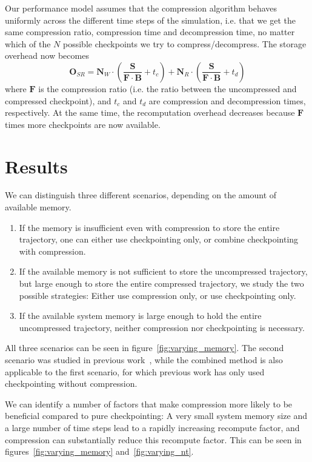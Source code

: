 \documentclass[conference]{IEEEtran}
\begin{document}
Our performance model assumes
 that the compression algorithm behaves uniformly
across the different time steps of the simulation, i.e. that we get the same compression ratio, compression time and 
decompression time, no matter which of the $N$ possible checkpoints we try to compress/decompress. The storage overhead
now becomes
\begin{equation}
\mathbf{O}_{SR} = \mathbf{N}_W \cdot \left(\frac{\mathbf{S}}{\mathbf{F}
  \cdot \mathbf{B}} + t_c\right) + \mathbf{N}_R \cdot
\left(\frac{\mathbf{S}}{\mathbf{F} \cdot \mathbf{B}} + t_d\right)
\end{equation}
where $\mathbf{F}$ is the compression ratio (i.e. the ratio between the uncompressed and compressed checkpoint), and $t_c$
and $t_d$ are compression and decompression times, respectively. At the same
time, the recomputation overhead decreases
because $\mathbf{F}$ times more checkpoints are now available.

\section{Results}
\label{sec:results}
We can distinguish three different scenarios, depending on the amount of
available memory.
\begin{enumerate}
\item If the memory is insufficient even with compression to store the entire
trajectory, one can either use checkpointing only, or combine checkpointing with
compression.
\item If the available memory is not sufficient to store the uncompressed
trajectory, but large enough to store the entire compressed trajectory, we study
the two possible strategies: Either use compression only, or use checkpointing
only.
\item If the available system memory is large enough to hold the entire
uncompressed trajectory, neither compression nor checkpointing is necessary.
\end{enumerate}
All three scenarios can be seen in figure~\ref{fig:varying_memory}.
The second scenario was studied in previous work~\cite{cyr2015towards}, while
the combined method is also applicable to the first scenario, for which previous
work has only used checkpointing without compression.

We can identify a number of factors that make compression more likely to be
beneficial compared to pure checkpointing: A very small system memory size and a
large number of time steps lead to a rapidly increasing recompute factor, and
compression can substantially reduce this recompute factor. This can be seen in
figures~\ref{fig:varying_memory} and~\ref{fig:varying_nt}.
\end{document}
